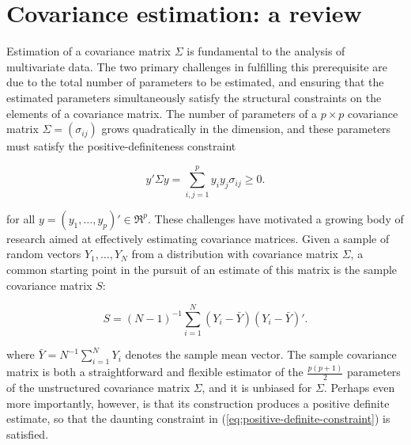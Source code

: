 

\chapter{Covariance estimation: a review} \label{background-review-chapter}

\indent

Estimation of a  covariance matrix $\Sigma$ is fundamental to the analysis of multivariate data. The two primary challenges in fulfilling this prerequisite are due to the total number of parameters to be estimated, and ensuring that the estimated parameters simultaneously satisfy the structural constraints on the elements of a covariance matrix. The number of parameters of a $p \times p$ covariance matrix $\Sigma = \left( \sigma_{ij} \right)$ grows quadratically in the dimension, and these parameters must satisfy the positive-definiteness constraint

\begin{equation} \label{eq:positive-definite-constraint} 
y'\Sigma y = \sum_{i,j = 1}^p y_i y_j \sigma_{ij} \ge 0. 
\end{equation} 

\noindent
for all $y = \left(y_1,\dots, y_p \right)' \in \Re^p$. These challenges have motivated a growing body of research aimed at effectively estimating covariance matrices. Given a sample of random vectors $Y_1,\dots, Y_N$ from a distribution with covariance matrix $\Sigma$, a common starting point in the pursuit of an estimate of this matrix is the sample covariance matrix $S$:

\begin{equation} \label{eq:sample-covariance-matrix}
S = \left(N-1\right)^{-1} \sum_{i = 1}^N \left(Y_i - \bar{Y}\right)\left(Y_i - \bar{Y}\right)'.
\end{equation}

\noindent
where $\bar{Y} = N^{-1}\sum_{i=1}^N Y_i$ denotes the sample mean vector. The sample covariance matrix is both a straightforward and flexible estimator of the $\frac{p\left(p+1\right)}{2}$ parameters of the unstructured covariance matrix $\Sigma$, and it is unbiased for $\Sigma$. Perhaps even more importantly, however, is that its construction produces a positive definite estimate, so that the daunting constraint in (\ref{eq:positive-definite-constraint}) is satisfied. 

\bigskip

